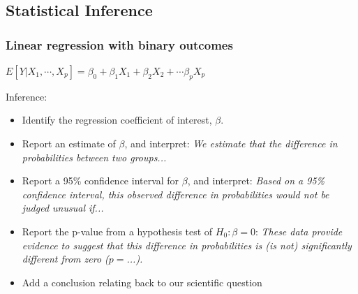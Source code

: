 \documentclass[12pt, 
hyperref={colorlinks=true, linkcolor=blue, urlcolor=cyan}]{beamer}
\begin{document}
\subsection{Statistical Inference}
\begin{frame}
\frametitle{Linear regression with binary outcomes}
\begin{center} $E[Y|X_1,\cdots,X_p] = \beta_0 + \beta_1 X_1 + \beta_2 X_2 + \cdots \beta_p X_p$ \end{center}

\vspace{-0.6cm}
\color{blue} Inference: \vspace{-0.3cm} \color{black}
\begin{itemize}
\item Identify the regression coefficient of interest, $\beta$. \pause %
\item Report an estimate of $\beta$, and interpret: \textit{We estimate that the difference in probabilities between two groups...} \pause
\item Report a 95\% confidence interval for $\beta$, and interpret: \textit{Based on a 95\% confidence interval, this observed difference in probabilities would not be judged unusual if...} \pause
\item Report the p-value from a hypothesis test of $H_0: \beta = 0$: \textit{These data provide evidence to suggest that this difference in probabilities is (is not) significantly different from zero ($p =$...).} \pause
\item Add a conclusion relating back to our scientific question
\end{itemize}
\end{frame}
\end{document}
